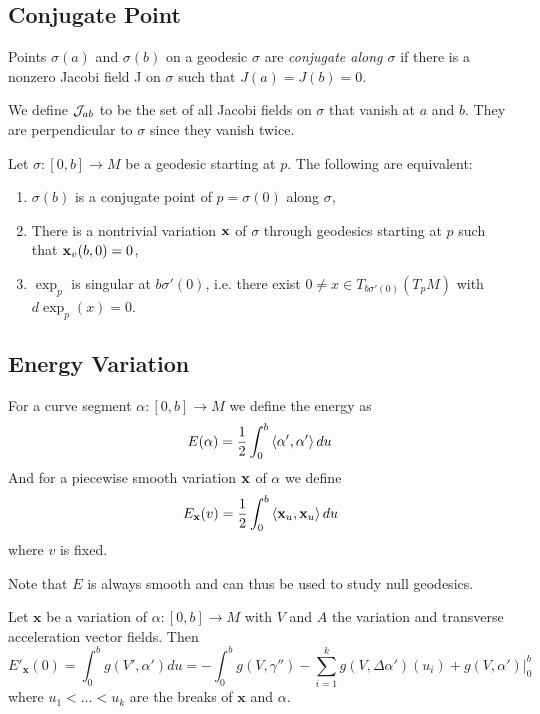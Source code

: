 \subsection{Conjugate Point}
\begin{definition}
Points $\sigma(a)$ and $\sigma(b)$ on a geodesic $\sigma$ are \emph{conjugate along $\sigma$} if there is a nonzero Jacobi field J on $\sigma$ such that $J(a) = J(b) = 0$.
\end{definition}

We define $\mathcal{J}_{ab}$ to be the set of all Jacobi fields on $\sigma$ that vanish at $a$ and $b$.
They are perpendicular to $\sigma$ since they vanish twice.

\begin{proposition}
Let $\sigma:[0,b]\to M$ be a geodesic starting at $p$. The following are equivalent:

\begin{enumerate}
    \item $\sigma(b)$ is a conjugate point of $p=\sigma(0)$ along $\sigma$,
    \item There is a nontrivial variation $\mathbf{x}$ of $\sigma$ through geodesics starting at $p$ such that $\mathbf{x}_v(b,0)=0$,
    \item $\exp_p$ is singular at $b\sigma'(0)$, i.e. there exist $0\neq x\in T_{b\sigma'(0)}(T_pM)$ with $d\exp_p(x)=0$.
\end{enumerate}
\end{proposition}

\subsection{Energy Variation}
For a curve segment $\alpha:[0,b]\to M$ we define the energy as 
\[
E(\alpha) = \frac{1}{2}\int_0^b\left\langle \alpha',\alpha' \right\rangle du
\]
And for a piecewise smooth variation $\mathbf{x}$ of $\alpha$ we define
\[
E_{\mathbf{x}}(v) = \frac{1}{2}\int_0^b\left\langle \mathbf{x}_u,\mathbf{x}_u \right\rangle du
\]
where $v$ is fixed.

Note that $E$ is always smooth and can thus be used to study null geodesics.

\begin{proposition}\label{prop:Evariation}
Let $\mathbf{x}$ be a variation of $\alpha:[0,b]\to M$ with $V$ and $A$ the variation and transverse acceleration vector fields. Then
\[
    E'_{\mathbf{x}}(0) = \int_0^b g(V',\alpha')du = - \int_0^b g(V,\gamma'') - \sum_{i=1}^k g(V,\Delta\alpha')(u_i) + \left.g(V,\alpha')\right\rvert^b_0
\]
where $u_1<\dots<u_k$ are the breaks of $\mathbf{x}$ and $\alpha$.
\end{proposition}

